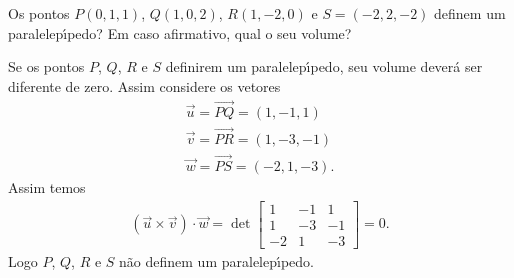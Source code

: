 \begin{exemplo}
  Os pontos $P(0,1,1)$, $Q(1,0,2)$, $R(1,-2,0)$ e $S = (-2,2,-2)$ definem um paralelep{\'\i}pedo? Em caso afirmativo, qual o seu volume?
  \begin{solucao}
    Se os pontos $P$, $Q$, $R$ e $S$ definirem um paralelep{\'\i}pedo, seu volume dever\'a ser diferente de zero. Assim considere os vetores
    \begin{align*}
      \vec{u} = \vec{PQ} = (1,-1,1)\\
      \vec{v} = \vec{PR} = (1,-3,-1)\\
      \vec{w} = \vec{PS} = (-2,1,-3).
    \end{align*}
    Assim temos
    \begin{align*}
      (\vec{u}\times\vec{v})\cdot\vec{w} = \det \begin{bmatrix}
        1 & -1 & 1\\
        1 & -3 & -1\\
        -2 & 1 & -3
      \end{bmatrix} = 0.
    \end{align*}
    Logo $P$, $Q$, $R$ e $S$ n\~ao definem um paralelep{\'\i}pedo.
  \end{solucao}
\end{exemplo}

